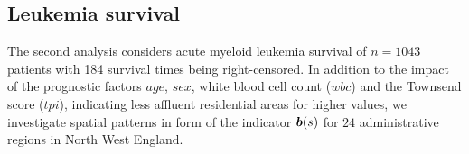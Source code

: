 \documentclass[12pt]{article}
\theoremstyle{plain}
\begin{document}


\subsection{Leukemia survival}\label{sec:lung}

The second analysis considers acute myeloid leukemia survival of $n=1043$ patients \citep{henderson2002modeling}  with 184 survival times being right-censored. In addition to the impact of the prognostic factors $\mathit{age}$, $\mathit{sex}$, white blood cell count ($\mathit{wbc}$) and the Townsend score ($\mathit{tpi}$), indicating less affluent residential areas for higher values, we investigate spatial patterns in form of the  indicator $\text{\boldmath$b$}(s)$ for $24$ administrative regions in North West England. 
\end{document}
